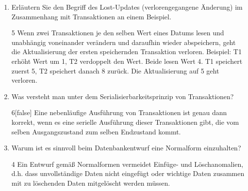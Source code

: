 
\begin{enumerate}

\item 
Erläutern Sie den Begriff des Lost-Updates (verlorengegangene Änderung) im
Zusammenhang mit Transaktionen an einem Beispiel.

\begin{solution}{5}
Wenn zwei Transaktionen je den selben Wert eines Datums
lesen und unabhängig voneinander verändern und daraufhin wieder abspeichern,
geht die Aktualisierung der ersten speichernden Transaktion verloren. Beispiel:
T1 erhöht Wert um 1, T2 verdoppelt den Wert. Beide lesen Wert 4. T1 speichert
zuerst 5, T2 speichert danach 8 zurück. Die Aktualisierung auf 5 geht verloren.
\end{solution}


\item 
Was versteht man unter dem Serialisierbarkeitsprinzip von Transaktionen? 

\begin{solution}{6}[false]
Eine nebenläufige Ausführung von Transaktionen ist genau dann korrekt, wenn es
eine serielle Ausführung dieser Transaktionen gibt, die vom selben
Ausgangszustand zum selben Endzustand kommt.
\end{solution}


\item
Warum ist es sinnvoll beim Datenbankentwurf eine Normalform einzuhalten?

\begin{solution}{4}
Ein Entwurf gemäß Normalformen vermeidet Einfüge- und Löschanomalien, d.h. dass
unvollständige Daten nicht eingefügt oder wichtige Daten zusammen mit zu
löschenden Daten mitgelöscht werden müssen.
\end{solution}


\end{enumerate}
